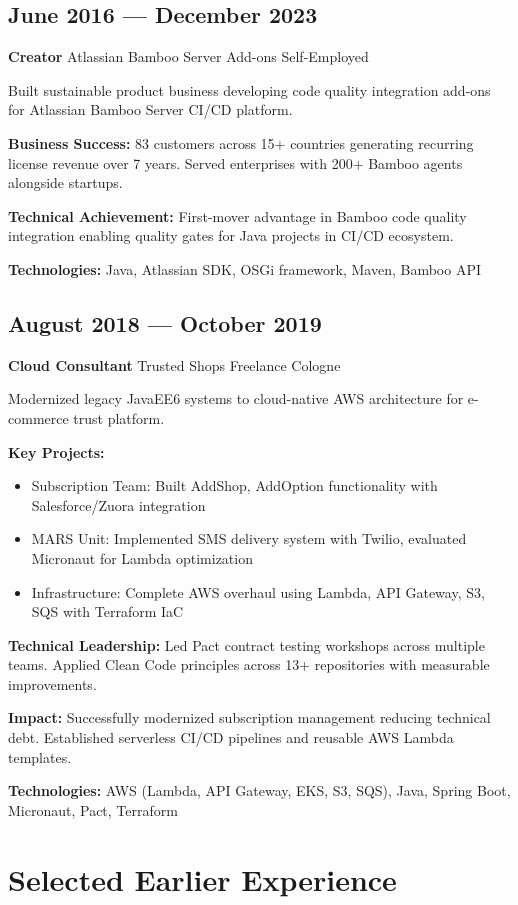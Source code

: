 \documentclass[10pt,a4paper]{article}
\newcommand{\role}[4]{\subsection{#1}\textbf{#2} \textbar{} #3 \textbar{} #4\vspace{2pt}}
\begin{document}
\role{June 2016 — December 2023}{Creator}{Atlassian Bamboo Server Add-ons}{Self-Employed}

Built sustainable product business developing code quality integration add-ons for Atlassian Bamboo Server CI/CD platform.

\textbf{Business Success:} 83 customers across 15+ countries generating recurring license revenue over 7 years. Served enterprises with 200+ Bamboo agents alongside startups.

\textbf{Technical Achievement:} First-mover advantage in Bamboo code quality integration enabling quality gates for Java projects in CI/CD ecosystem.

\textbf{Technologies:} Java, Atlassian SDK, OSGi framework, Maven, Bamboo API

\vspace{4pt}

\role{August 2018 — October 2019}{Cloud Consultant}{Trusted Shops}{Freelance \textbar{} Cologne}

Modernized legacy JavaEE6 systems to cloud-native AWS architecture for e-commerce trust platform.

\textbf{Key Projects:}
\begin{itemize}[leftmargin=12pt,itemsep=1pt]
\item Subscription Team: Built AddShop, AddOption functionality with Salesforce/Zuora integration
\item MARS Unit: Implemented SMS delivery system with Twilio, evaluated Micronaut for Lambda optimization
\item Infrastructure: Complete AWS overhaul using Lambda, API Gateway, S3, SQS with Terraform IaC
\end{itemize}

\textbf{Technical Leadership:} Led Pact contract testing workshops across multiple teams. Applied Clean Code principles across 13+ repositories with measurable improvements.

\textbf{Impact:} Successfully modernized subscription management reducing technical debt. Established serverless CI/CD pipelines and reusable AWS Lambda templates.

\textbf{Technologies:} AWS (Lambda, API Gateway, EKS, S3, SQS), Java, Spring Boot, Micronaut, Pact, Terraform

\section{Selected Earlier Experience}
\end{document}
